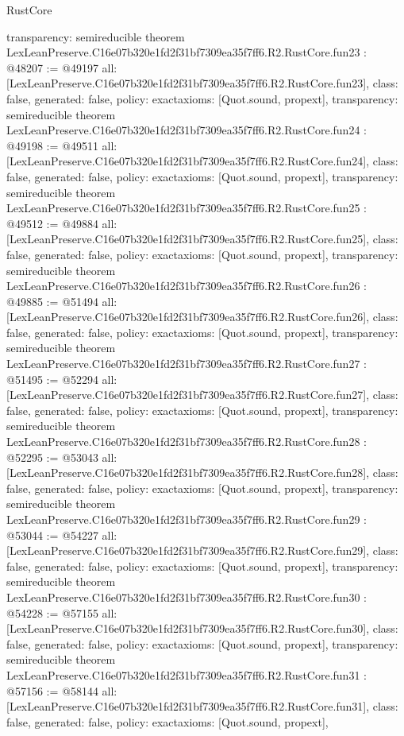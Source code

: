 \begin{lexlean}{RustCore}
\begin{coremodule}
{  transparency: semireducible
}
theorem LexLeanPreserve.C16e07b320e1fd2f31bf7309ea35f7ff6.R2.RustCore.fun23 : @48207 := @49197 {
  all: [LexLeanPreserve.C16e07b320e1fd2f31bf7309ea35f7ff6.R2.RustCore.fun23],
  class: false,
  generated: false,
  policy: exact{axioms: [Quot.sound, propext]},
  transparency: semireducible
}
theorem LexLeanPreserve.C16e07b320e1fd2f31bf7309ea35f7ff6.R2.RustCore.fun24 : @49198 := @49511 {
  all: [LexLeanPreserve.C16e07b320e1fd2f31bf7309ea35f7ff6.R2.RustCore.fun24],
  class: false,
  generated: false,
  policy: exact{axioms: [Quot.sound, propext]},
  transparency: semireducible
}
theorem LexLeanPreserve.C16e07b320e1fd2f31bf7309ea35f7ff6.R2.RustCore.fun25 : @49512 := @49884 {
  all: [LexLeanPreserve.C16e07b320e1fd2f31bf7309ea35f7ff6.R2.RustCore.fun25],
  class: false,
  generated: false,
  policy: exact{axioms: [Quot.sound, propext]},
  transparency: semireducible
}
theorem LexLeanPreserve.C16e07b320e1fd2f31bf7309ea35f7ff6.R2.RustCore.fun26 : @49885 := @51494 {
  all: [LexLeanPreserve.C16e07b320e1fd2f31bf7309ea35f7ff6.R2.RustCore.fun26],
  class: false,
  generated: false,
  policy: exact{axioms: [Quot.sound, propext]},
  transparency: semireducible
}
theorem LexLeanPreserve.C16e07b320e1fd2f31bf7309ea35f7ff6.R2.RustCore.fun27 : @51495 := @52294 {
  all: [LexLeanPreserve.C16e07b320e1fd2f31bf7309ea35f7ff6.R2.RustCore.fun27],
  class: false,
  generated: false,
  policy: exact{axioms: [Quot.sound, propext]},
  transparency: semireducible
}
theorem LexLeanPreserve.C16e07b320e1fd2f31bf7309ea35f7ff6.R2.RustCore.fun28 : @52295 := @53043 {
  all: [LexLeanPreserve.C16e07b320e1fd2f31bf7309ea35f7ff6.R2.RustCore.fun28],
  class: false,
  generated: false,
  policy: exact{axioms: [Quot.sound, propext]},
  transparency: semireducible
}
theorem LexLeanPreserve.C16e07b320e1fd2f31bf7309ea35f7ff6.R2.RustCore.fun29 : @53044 := @54227 {
  all: [LexLeanPreserve.C16e07b320e1fd2f31bf7309ea35f7ff6.R2.RustCore.fun29],
  class: false,
  generated: false,
  policy: exact{axioms: [Quot.sound, propext]},
  transparency: semireducible
}
theorem LexLeanPreserve.C16e07b320e1fd2f31bf7309ea35f7ff6.R2.RustCore.fun30 : @54228 := @57155 {
  all: [LexLeanPreserve.C16e07b320e1fd2f31bf7309ea35f7ff6.R2.RustCore.fun30],
  class: false,
  generated: false,
  policy: exact{axioms: [Quot.sound, propext]},
  transparency: semireducible
}
theorem LexLeanPreserve.C16e07b320e1fd2f31bf7309ea35f7ff6.R2.RustCore.fun31 : @57156 := @58144 {
  all: [LexLeanPreserve.C16e07b320e1fd2f31bf7309ea35f7ff6.R2.RustCore.fun31],
  class: false,
  generated: false,
  policy: exact{axioms: [Quot.sound, propext]},
}
\end{coremodule}
\end{lexlean}
